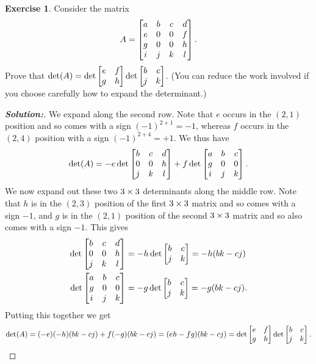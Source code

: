 \documentclass[a4paper]{amsart}
\theoremstyle{definition}
\newtheorem{exercise}{Exercise}
\newenvironment{solution}{\begin{proof}[\textbf{Solution:}] \vphantom{u}}{\end{proof}}
\begin{document}
\begin{exercise}\label{ex-det-ii}
 Consider the matrix
 \[ A = \left[\begin{matrix} a & b & c & d \\
             e & 0 & 0 & f \\
             g & 0 & 0 & h \\
             i & j & k & l \end{matrix}\right].
 \]
 Prove that $\det(A)=\det\left[\begin{matrix} e&f\\g&h\end{matrix}\right]\det\left[\begin{matrix} b&c\\j&k\end{matrix}\right]$.
 (You can reduce the work involved if you choose carefully how to
 expand the determinant.)
\end{exercise}
\begin{solution}
 We expand along the second row.  Note that $e$ occurs in the $(2,1)$
 position and so comes with a sign $(-1)^{2+1}=-1$, whereas $f$ occurs
 in the $(2,4)$ position with a sign $(-1)^{2+4}=+1$.  We thus have
 \[ \det(A) = -e\det\left[\begin{matrix} b&c&d \\ 0&0&h \\ j&k&l \end{matrix}\right]
              +f\det\left[\begin{matrix} a&b&c \\ g&0&0 \\ i&j&k \end{matrix}\right].
 \]
 We now expand out these two $3\times 3$ determinants along the middle
 row.  Note that $h$ is in the $(2,3)$ position of the first $3\times 3$
 matrix and so comes with a sign $-1$, and $g$ is in the $(2,1)$
 position of the second $3\times 3$ matrix and so also comes with a sign
 $-1$.  This gives 
 \begin{align*}
  \det\left[\begin{matrix} b&c&d \\ 0&0&h \\ j&k&l \end{matrix}\right]
   &= -h \det\left[\begin{matrix} b&c\\ j&k \end{matrix}\right] = -h(bk-cj) \\
  \det\left[\begin{matrix} a&b&c \\ g&0&0 \\ i&j&k \end{matrix}\right]
   &= -g \det\left[\begin{matrix} b&c\\ j&k \end{matrix}\right] = -g(bk-cj).
 \end{align*}
 Putting this together we get 
 \[ \det(A) = (-e)(-h)(bk-cj) +f(-g)(bk-cj)
            = (eh-fg)(bk-cj) 
            = \det\left[\begin{matrix} e&f\\g&h\end{matrix}\right]\det\left[\begin{matrix} b&c\\j&k\end{matrix}\right].
 \]
\end{solution}
\end{document}
